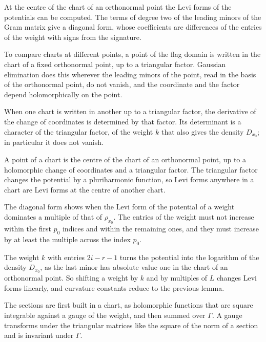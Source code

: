 At the centre of the chart of an orthonormal point the Levi forms of the potentials can be computed. The terms of
degree two of the leading minors of the Gram matrix give a diagonal form, whose coefficients are differences of
the entries of the weight with signs from the signature.

To compare charts at different points, a point of the flag domain is written in the chart of a fixed orthonormal
point, up to a triangular factor. Gaussian elimination does this wherever the leading minors of the point, read in
the basis of the orthonormal point, do not vanish, and the coordinate and the factor depend holomorphically on the
point.

When one chart is written in another up to a triangular factor, the derivative of the change of coordinates is
determined by that factor. Its determinant is a character of the triangular factor, of the weight $k$ that also
gives the density $D_{x_0}$; in particular it does not vanish.

A point of a chart is the centre of the chart of an orthonormal point, up to a holomorphic change of coordinates
and a triangular factor. The triangular factor changes the potential by a pluriharmonic function, so Levi forms
anywhere in a chart are Levi forms at the centre of another chart.

The diagonal form shows when the Levi form of the potential of a weight dominates a multiple of that of
$\rho_{x_0}$. The entries of the weight must not increase within the first $p_0$ indices and within the remaining
ones, and they must increase by at least the multiple across the index $p_0$.

The weight $k$ with entries $2i-r-1$ turns the potential into the logarithm of the density $D_{x_0}$, as the last
minor has absolute value one in the chart of an orthonormal point. So shifting a weight by $k$ and by multiples
of $L$ changes Levi forms linearly, and curvature constants reduce to the previous lemma.

The sections are first built in a chart, as holomorphic functions that are square integrable against a gauge of
the weight, and then summed over $\Gamma$. A gauge transforms under the triangular matrices like the square of the
norm of a section and is invariant under $\Gamma$.

